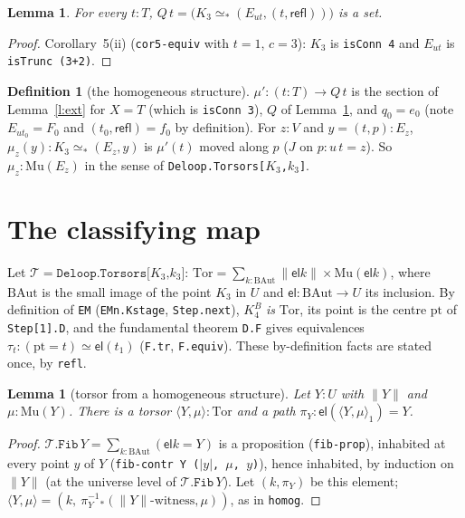 \documentclass[11pt]{amsart}
\newtheorem{lemma}[theorem]{Lemma}
\theoremstyle{definition}
\newtheorem{definition}[theorem]{Definition}
\theoremstyle{remark}
\newcommand{\code}[1]{\texttt{#1}}
\newcommand{\refl}{\mathsf{refl}}
\newcommand{\el}{\mathsf{el}}
\newcommand{\tr}[1]{\|#1\|}
\begin{document}
\begin{lemma}\label{l:setfam}
For every $t:T$, $Q\,t=\bigl(K_3\simeq_*(E_{u t},(t,\refl))\bigr)$ is a set.
\end{lemma}
\begin{proof}
Corollary~5(ii) (\code{cor5-equiv} with $t=1$, $c=3$): $K_3$ is
\code{isConn 4} and $E_{ut}$ is \code{isTrunc (3+2)}.
\end{proof}

\begin{definition}[the homogeneous structure]\label{d:mu}
$\mu':(t:T)\to Q\,t$ is the section of Lemma~\ref{l:ext} for $X=T$ (which is
\code{isConn 3}), $Q$ of Lemma~\ref{l:setfam}, and $q_0=e_0$ (note
$E_{u t_0}=F_0$ and $(t_0,\refl)=f_0$ by definition). For $z:V$ and
$y=(t,p):E_z$, $\mu_z(y):K_3\simeq_*(E_z,y)$ is $\mu'(t)$ moved along $p$
($J$ on $p:u\,t=z$). So $\mu_z:\mathrm{Mu}(E_z)$ in the sense of
\code{Deloop.Torsors[$K_3$,$k_3$]}.
\end{definition}

\section{The classifying map}

Let $\mathcal{T}=\code{Deloop.Torsors[$K_3$,$k_3$]}$: $\mathrm{Tor}=\sum_{k:\mathrm{BAut}}\tr{\el k}\times\mathrm{Mu}(\el k)$,
where $\mathrm{BAut}$ is the small image of the point $K_3$ in $U$ and
$\el:\mathrm{BAut}\to U$ its inclusion. By definition of \code{EM}
(\code{EMn.Kstage}, \code{Step.next}), $K^B_4$ \emph{is} $\mathrm{Tor}$, its
point is the centre $\mathrm{pt}$ of \code{Step[1].D}, and the fundamental
theorem \code{D.F} gives equivalences
$\tau_t:(\mathrm{pt}=t)\simeq\el(t_1)$ (\code{F.tr}, \code{F.equiv}).
These by-definition facts are stated once, by \code{refl}.

\begin{lemma}[torsor from a homogeneous structure]\label{l:tor}
Let $Y:U$ with $\tr Y$ and $\mu:\mathrm{Mu}(Y)$. There is a torsor
$\langle Y,\mu\rangle:\mathrm{Tor}$ and a path $\pi_Y:\el(\langle Y,\mu\rangle_1)=Y$.
\end{lemma}
\begin{proof}
$\mathcal{T}.\code{Fib}\,Y=\sum_{k:\mathrm{BAut}}(\el k=Y)$ is a proposition
(\code{fib-prop}), inhabited at every point $y$ of $Y$
(\code{fib-contr Y ($|y|$, $\mu$, $y$)}), hence inhabited, by induction on
$\tr Y$ (at the universe level of $\mathcal{T}.\code{Fib}\,Y$). Let $(k,\pi_Y)$ be
this element; $\langle Y,\mu\rangle=(k,\ \pi_Y^{-1}{}_*(\tr Y\text{-witness},\mu))$, as in
\code{homog}.
\end{proof}
\end{document}
